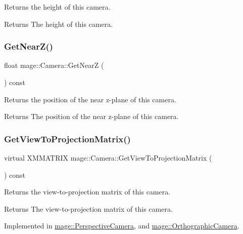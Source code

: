 Returns the height of this camera.

\begin{DoxyReturn}{Returns}
The height of this camera. 
\end{DoxyReturn}
\hypertarget{classmage_1_1_camera_a175e3c36526a8a3e28cd2f8bd1701c55}{}\label{classmage_1_1_camera_a175e3c36526a8a3e28cd2f8bd1701c55} 
\subsubsection{\texorpdfstring{Get\+Near\+Z()}{GetNearZ()}}
{\footnotesize\ttfamily float mage\+::\+Camera\+::\+Get\+NearZ (\begin{DoxyParamCaption}{ }\end{DoxyParamCaption}) const}

Returns the position of the near z-\/plane of this camera.

\begin{DoxyReturn}{Returns}
The position of the near z-\/plane of this camera. 
\end{DoxyReturn}
\hypertarget{classmage_1_1_camera_a1f5206864cf18b5548219492556df5d2}{}\label{classmage_1_1_camera_a1f5206864cf18b5548219492556df5d2} 
\subsubsection{\texorpdfstring{Get\+View\+To\+Projection\+Matrix()}{GetViewToProjectionMatrix()}}
{\footnotesize\ttfamily virtual X\+M\+M\+A\+T\+R\+IX mage\+::\+Camera\+::\+Get\+View\+To\+Projection\+Matrix (\begin{DoxyParamCaption}{ }\end{DoxyParamCaption}) const\hspace{0.3cm}{\ttfamily [pure virtual]}}

Returns the view-\/to-\/projection matrix of this camera.

\begin{DoxyReturn}{Returns}
The view-\/to-\/projection matrix of this camera. 
\end{DoxyReturn}


Implemented in \hyperlink{classmage_1_1_perspective_camera_a83a38a4e8180707df2323130f9cee4a5}{mage\+::\+Perspective\+Camera}, and \hyperlink{classmage_1_1_orthographic_camera_aedd86e56a0f7bc967ad8d9be2631a0cf}{mage\+::\+Orthographic\+Camera}.

